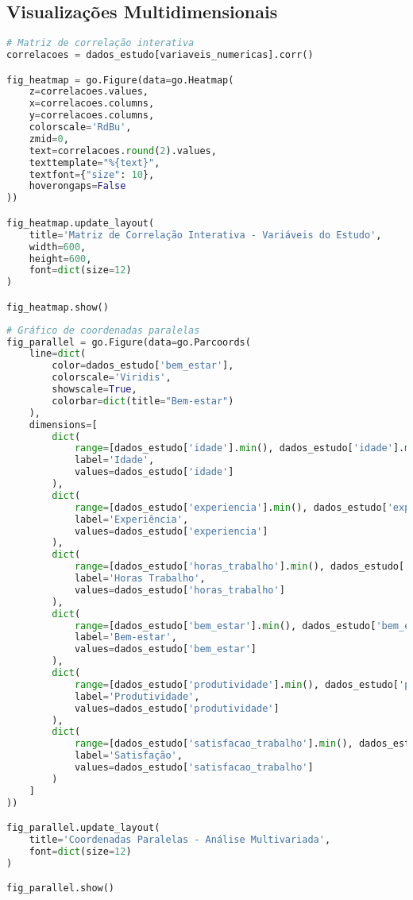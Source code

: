 \subsection{Visualizações Multidimensionais}

\begin{pythonbox}
\begin{lstlisting}[language=Python]
# Matriz de correlação interativa
correlacoes = dados_estudo[variaveis_numericas].corr()

fig_heatmap = go.Figure(data=go.Heatmap(
    z=correlacoes.values,
    x=correlacoes.columns,
    y=correlacoes.columns,
    colorscale='RdBu',
    zmid=0,
    text=correlacoes.round(2).values,
    texttemplate="%{text}",
    textfont={"size": 10},
    hoverongaps=False
))

fig_heatmap.update_layout(
    title='Matriz de Correlação Interativa - Variáveis do Estudo',
    width=600,
    height=600,
    font=dict(size=12)
)

fig_heatmap.show()
\end{lstlisting}
\end{pythonbox}

\begin{pythonbox}
\begin{lstlisting}[language=Python]
# Gráfico de coordenadas paralelas
fig_parallel = go.Figure(data=go.Parcoords(
    line=dict(
        color=dados_estudo['bem_estar'],
        colorscale='Viridis',
        showscale=True,
        colorbar=dict(title="Bem-estar")
    ),
    dimensions=[
        dict(
            range=[dados_estudo['idade'].min(), dados_estudo['idade'].max()],
            label='Idade',
            values=dados_estudo['idade']
        ),
        dict(
            range=[dados_estudo['experiencia'].min(), dados_estudo['experiencia'].max()],
            label='Experiência',
            values=dados_estudo['experiencia']
        ),
        dict(
            range=[dados_estudo['horas_trabalho'].min(), dados_estudo['horas_trabalho'].max()],
            label='Horas Trabalho',
            values=dados_estudo['horas_trabalho']
        ),
        dict(
            range=[dados_estudo['bem_estar'].min(), dados_estudo['bem_estar'].max()],
            label='Bem-estar',
            values=dados_estudo['bem_estar']
        ),
        dict(
            range=[dados_estudo['produtividade'].min(), dados_estudo['produtividade'].max()],
            label='Produtividade',
            values=dados_estudo['produtividade']
        ),
        dict(
            range=[dados_estudo['satisfacao_trabalho'].min(), dados_estudo['satisfacao_trabalho'].max()],
            label='Satisfação',
            values=dados_estudo['satisfacao_trabalho']
        )
    ]
))

fig_parallel.update_layout(
    title='Coordenadas Paralelas - Análise Multivariada',
    font=dict(size=12)
)

fig_parallel.show()
\end{lstlisting}
\end{pythonbox}

